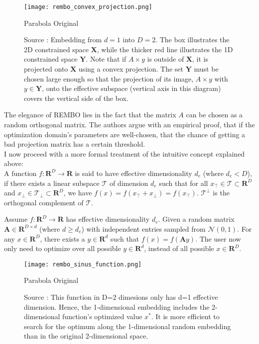 \begin{figure}[H]
    \centering
        \texttt{[image: rembo\_convex\_projection.png]}
        \caption{Parabola Original}
        \label{fig:gull}
    \caption{
    Source \citep{Wang2013}: Embedding from $d = 1$ into $D=2$.
    The box illustrates the 2D constrained space $\mathbf{X}$, while the thicker red line illustrates the 1D constrained space $\mathbf{Y}$.
    Note that if $A \times y$ is outside of $\mathbf{X}$, it is projected onto $\mathbf{X}$ using a convex projection.
    The set $\mathbf{Y}$ must be chosen large enough so that the projection of its image, $A \times y $ with $y \in \mathbf{Y}$, onto the effective subspace (vertical axis in this diagram) covers the vertical side of the box.
    }\label{fig:animals}
\end{figure}

The elegance of REMBO lies in the fact that the matrix $A$ can be chosen as a random orthogonal matrix.
The authors argue with an empirical proof, that if the optimization domain's parameters are well-chosen, that the chance of getting a bad projection matrix has a certain threshold. \\

I now proceed with a more formal treatment of the intuitive concept explained above: \\

\cite{Wang}
A function $f : \mathbf{R}^D \rightarrow \mathbf{R}$ is said to have effective dimensionality $d_e$ (where $d_e < D$), if there exists a linear subspace $\mathcal{T}$ of dimension $d_e$ such that for all $ x_\top \in \mathcal{T} \subset \mathbf{R}^D $ and $x_\perp \in \mathcal{T_\perp} \subset \mathbf{R}^D $, we have $ f(x) = f(x_\top +x_\perp ) = f(x_\top)$.
$\mathcal{T^\perp}$ is the orthogonal complement of $\mathcal{T}$.

Assume $ f : \mathbf{R}^D \rightarrow \mathbf{R} $ has effective dimensionality $d_e$.
Given a random matrix $ \mathbf{A} \in \mathbf{R}^{D \times d} $ (where $d \geq d_e$) with independent entries sampled from $ \mathcal{N}(0, 1) $.
For any $ x \in \mathbf{R}^D $, there exists a $y \in \mathbf{R}^d $ such that $ f(x) = f(\mathbf{A} y ) $.
The user now only need to optimize over all possible $y \in \mathbf{R}^d$, instead of all possible $x \in \mathbf{R}^D $. \\


\begin{figure}[H]
    \centering
        \texttt{[image: rembo\_sinus\_function.png]}
        \caption{Parabola Original}
        \label{fig:gull}
    \caption{
    Source \citep{Wang2013}: This function in D=2 dimesions only has d=1 effective dimension.
    Hence, the 1-dimensional embedding includes the 2-dimensional function’s optimized value $x^*$. 
    It is more efficient to search for the optimum along the 1-dimensional random embedding than in the original 2-dimensional space.
    }\label{fig:animals}
\end{figure}

